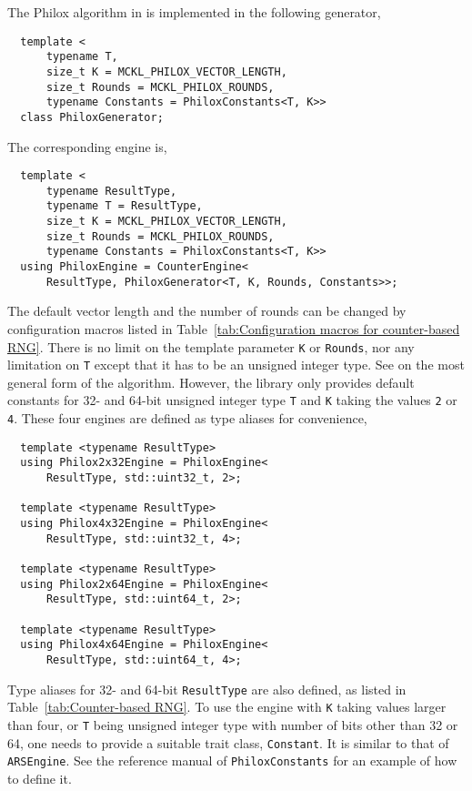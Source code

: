 The Philox algorithm in \cite{Salmon:2011um} is implemented in the following
generator,
\begin{Verbatim}
  template <
      typename T,
      size_t K = MCKL_PHILOX_VECTOR_LENGTH,
      size_t Rounds = MCKL_PHILOX_ROUNDS,
      typename Constants = PhiloxConstants<T, K>>
  class PhiloxGenerator;
\end{Verbatim}
The corresponding \rng engine is,
\begin{Verbatim}
  template <
      typename ResultType,
      typename T = ResultType,
      size_t K = MCKL_PHILOX_VECTOR_LENGTH,
      size_t Rounds = MCKL_PHILOX_ROUNDS,
      typename Constants = PhiloxConstants<T, K>>
  using PhiloxEngine = CounterEngine<
      ResultType, PhiloxGenerator<T, K, Rounds, Constants>>;
\end{Verbatim}
The default vector length and the number of rounds can be changed by
configuration macros listed in Table~\ref{tab:Configuration macros for
  counter-based RNG}. There is no limit on the template parameter \verb|K| or
\verb|Rounds|, nor any limitation on \verb|T| except that it has to be an
unsigned integer type. See \cite{Salmon:2011um} on the most general form of the
algorithm. However, the library only provides default constants for 32- and
64-bit unsigned integer type \verb|T| and \verb|K| taking the values \verb|2|
or \verb|4|. These four engines are defined as type aliases for convenience,
\begin{Verbatim}
  template <typename ResultType>
  using Philox2x32Engine = PhiloxEngine<
      ResultType, std::uint32_t, 2>;

  template <typename ResultType>
  using Philox4x32Engine = PhiloxEngine<
      ResultType, std::uint32_t, 4>;

  template <typename ResultType>
  using Philox2x64Engine = PhiloxEngine<
      ResultType, std::uint64_t, 2>;

  template <typename ResultType>
  using Philox4x64Engine = PhiloxEngine<
      ResultType, std::uint64_t, 4>;
\end{Verbatim}
Type aliases for 32- and 64-bit \verb|ResultType| are also defined, as listed
in Table~\ref{tab:Counter-based RNG}. To use the engine with \verb|K| taking
values larger than four, or \verb|T| being unsigned integer type with number of
bits other than 32 or 64, one needs to provide a suitable trait class,
\verb|Constant|. It is similar to that of \verb|ARSEngine|. See the reference
manual of \verb|PhiloxConstants| for an example of how to define it.


